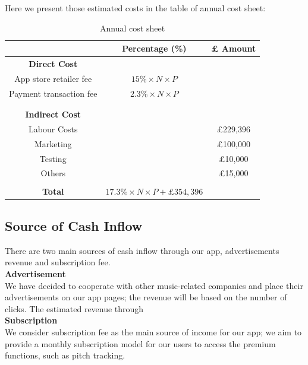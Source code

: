 Here we present those estimated costs in the table of annual cost sheet:

\begin{table}[ht]
\centering
\begin{tabular}{ |c|c|c|} 
 \hline
 &\textbf{Percentage (\%)} &\textbf{ £ Amount }\\
 \hline
\multicolumn{1}{|c}{\textbf{Direct Cost}} &\multicolumn{1}{c}{}&\\
 \hline
 App store retailer fee&$15\%\times N \times P$&\\
 \hline
 Payment transaction fee&$2.3\% \times N \times P$&\\
 \hline
 &&\\
 \hline
 \multicolumn{1}{|c}{}&\multicolumn{1}{c}{}&\\\hline
 \multicolumn{1}{|c}{\textbf{Indirect Cost}} &\multicolumn{1}{c}{}&\\
 \hline
 Labour Costs&&£229,396\\
 \hline
 Marketing&&£100,000\\
 \hline
 Testing&&£10,000\\
 \hline
 Others&&£15,000\\
 \hline
 \multicolumn{1}{|c}{}&\multicolumn{1}{c}{}&\\
 \hline
 \textbf{Total}&\multicolumn{1}{c}{$17.3\%\times N \times P + £354,396$}&\\
 \hline
 \end{tabular}
 \caption{Annual cost sheet}
 \end{table}


\subsection{Source of Cash Inflow}
There are two main sources of cash inflow through our app, advertisements revenue and subscription fee.
\\ \textbf{Advertisement}
\\ We have decided to cooperate with other music-related companies and place their advertisements on our app pages; the revenue will be based on the number of clicks. The estimated revenue through 
\\ \textbf{Subscription}
\\We consider subscription fee as the main source of income for our app; we aim to provide a monthly subscription model for our users to access the premium functions, such as pitch tracking.

